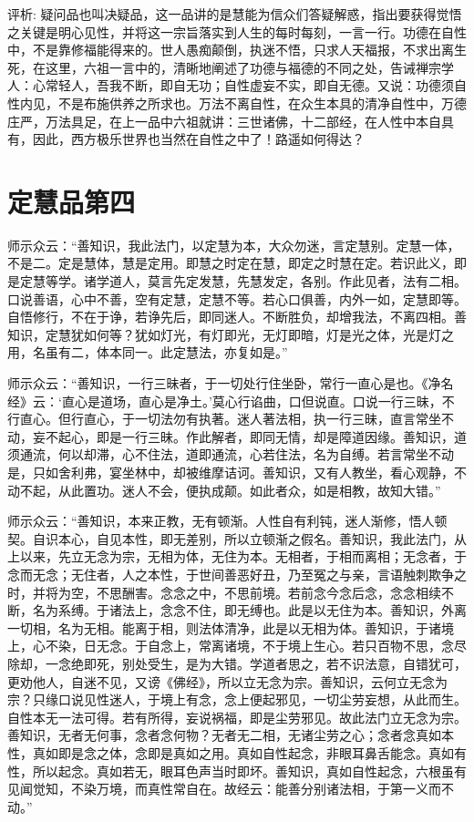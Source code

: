 \documentclass[12pt,twoside,openany]{book}
\newcommand{\kai}[1]{{\CJKfamily{kai}#1}}
\begin{document}
\kai{评析: 疑问品也叫决疑品，这一品讲的是慧能为信众们答疑解惑，指出要获得觉悟之关键是明心见性，并将这一宗旨落实到人生的每时每刻，一言一行。功德在自性中，不是靠修福能得来的。世人愚痴颠倒，执迷不悟，只求人天福报，不求出离生死，在这里，六祖一言中的，清晰地阐述了功德与福德的不同之处，告诫禅宗学人：心常轻人，吾我不断，即自无功；自性虚妄不实，即自无德。又说：功德须自性内见，不是布施供养之所求也。万法不离自性，在众生本具的清净自性中，万德庄严，万法具足，在上一品中六祖就讲：三世诸佛，十二部经，在人性中本自具有，因此，西方极乐世界也当然在自性之中了！路遥如何得达？}

\chapter{定慧品第四}
师示众云：“善知识，我此法门，以定慧为本，大众勿迷，言定慧别。定慧一体，不是二。定是慧体，慧是定用。即慧之时定在慧，即定之时慧在定。若识此义，即是定慧等学。诸学道人，莫言先定发慧，先慧发定，各别。作此见者，法有二相。口说善语，心中不善，空有定慧，定慧不等。若心口俱善，内外一如，定慧即等。自悟修行，不在于诤，若诤先后，即同迷人。不断胜负，却增我法，不离四相。善知识，定慧犹如何等？犹如灯光，有灯即光，无灯即暗，灯是光之体，光是灯之用，名虽有二，体本同一。此定慧法，亦复如是。”

师示众云：“善知识，一行三昧者，于一切处行住坐卧，常行一直心是也。《净名经》云：‘直心是道场，直心是净土。’莫心行谄曲，口但说直。口说一行三昧，不行直心。但行直心，于一切法勿有执著。迷人著法相，执一行三昧，直言常坐不动，妄不起心，即是一行三昧。作此解者，即同无情，却是障道因缘。善知识，道须通流，何以却滞，心不住法，道即通流，心若住法，名为自缚。若言常坐不动是，只如舍利弗，宴坐林中，却被维摩诘诃。善知识，又有人教坐，看心观静，不动不起，从此置功。迷人不会，便执成颠。如此者众，如是相教，故知大错。”

师示众云：“善知识，本来正教，无有顿渐。人性自有利钝，迷人渐修，悟人顿契。自识本心，自见本性，即无差别，所以立顿渐之假名。善知识，我此法门，从上以来，先立无念为宗，无相为体，无住为本。无相者，于相而离相；无念者，于念而无念；无住者，人之本性，于世间善恶好丑，乃至冤之与亲，言语触刺欺争之时，并将为空，不思酬害。念念之中，不思前境。若前念今念后念，念念相续不断，名为系缚。于诸法上，念念不住，即无缚也。此是以无住为本。善知识，外离一切相，名为无相。能离于相，则法体清净，此是以无相为体。善知识，于诸境上，心不染，日无念。于自念上，常离诸境，不于境上生心。若只百物不思，念尽除却，一念绝即死，别处受生，是为大错。学道者思之，若不识法意，自错犹可，更劝他人，自迷不见，又谤《佛经》，所以立无念为宗。善知识，云何立无念为宗？只缘口说见性迷人，于境上有念，念上便起邪见，一切尘劳妄想，从此而生。自性本无一法可得。若有所得，妄说祸福，即是尘劳邪见。故此法门立无念为宗。善知识，无者无何事，念者念何物？无者无二相，无诸尘劳之心；念者念真如本性，真如即是念之体，念即是真如之用。真如自性起念，非眼耳鼻舌能念。真如有性，所以起念。真如若无，眼耳色声当时即坏。善知识，真如自性起念，六根虽有见闻觉知，不染万境，而真性常自在。故经云：能善分别诸法相，于第一义而不动。”
\end{document}
